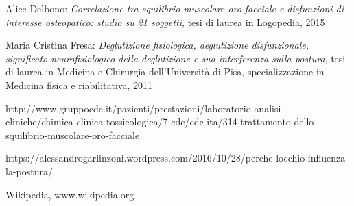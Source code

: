 \begin{thebibliography}{9}
Alice Delbono: \emph{Correlazione tra squilibrio muscolare oro-facciale e disfunzioni di interesse osteopatico: studio su 21 soggetti}, tesi di laurea in Logopedia, 2015

Maria Cristina Fresa: \emph{Deglutizione fisiologica, deglutizione disfunzionale, significato neurofisiologico della deglutizione e sua interferenza sulla postura}, tesi di laurea in Medicina e Chirurgia dell’Università di Pisa, specializzazione in Medicina fisica e riabilitativa, 2011

http://www.gruppocdc.it/pazienti/prestazioni/laboratorio-analisi-cliniche/chimica-clinica-tossicologica/7-cdc/cdc-ita/314-trattamento-dello-squilibrio-muscolare-oro-facciale

https://alessandrogarlinzoni.wordpress.com/2016/10/28/perche-locchio-influenza-la-postura/

Wikipedia, www.wikipedia.org

\end{thebibliography} 